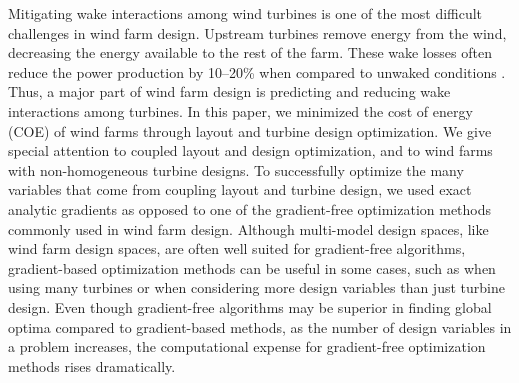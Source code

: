 \documentclass[wes, manuscript]{copernicus}
\begin{document}


\introduction  %

Mitigating wake interactions among wind turbines is one of the most difficult challenges in wind farm design. Upstream turbines remove energy from the wind, decreasing the energy available to the rest of the farm. These wake losses often reduce the power production by 10--20\% when compared to unwaked conditions \citep{barthelmie2007modelling,barthelmie2009modelling,briggs2013navigating}. 
Thus, a major part of wind farm design is predicting and reducing wake interactions among turbines. 
In this paper, we minimized the cost of energy (COE) of wind farms through layout and turbine design optimization. We give special attention to coupled layout and design optimization, and to wind farms with non-homogeneous turbine designs.
To successfully optimize the many variables that come from coupling layout and turbine design, we used exact analytic gradients as opposed to one of the gradient-free optimization methods commonly used in wind farm design.
Although multi-model design spaces, like wind farm design spaces, are often well suited for gradient-free algorithms, gradient-based optimization methods can be useful in some cases, such as when using many turbines or when considering more design variables than just turbine design. Even though gradient-free algorithms may be superior in finding global optima compared to gradient-based methods, as the number of design variables in a problem increases, the computational expense for gradient-free optimization methods rises dramatically. 
\end{document}
